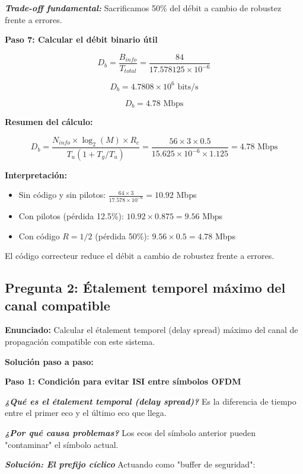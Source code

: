 \documentclass[11pt,a4paper]{article}
\begin{document}
\textit{\textbf{Trade-off fundamental:}} Sacrificamos 50\% del d\'ebit a cambio de robustez frente a errores.

\textbf{Paso 7: Calcular el d\'ebit binario \'util}

\[
D_b = \frac{B_{info}}{T_{total}} = \frac{84}{17.578125 \times 10^{-6}}
\]

\[
D_b = 4.7808 \times 10^6 \text{ bits/s}
\]

\[
\boxed{D_b = 4.78 \text{ Mbps}}
\]

\textbf{Resumen del c\'alculo:}

\[
D_b = \frac{N_{info} \times \log_2(M) \times R_c}{T_u(1 + T_g/T_u)} = \frac{56 \times 3 \times 0.5}{15.625 \times 10^{-6} \times 1.125} = 4.78 \text{ Mbps}
\]

\textbf{Interpretaci\'on:}

\begin{itemize}
    \item Sin c\'odigo y sin pilotos: $\frac{64 \times 3}{17.578 \times 10^{-6}} = 10.92$ Mbps
    \item Con pilotos (p\'erdida 12.5\%): $10.92 \times 0.875 = 9.56$ Mbps
    \item Con c\'odigo $R=1/2$ (p\'erdida 50\%): $9.56 \times 0.5 = 4.78$ Mbps
\end{itemize}

El c\'odigo correcteur reduce el d\'ebit a cambio de robustez frente a errores.

\subsection*{Pregunta 2: \'Etalement temporel m\'aximo del canal compatible}

\textbf{Enunciado:} Calcular el \'etalement temporel (delay spread) m\'aximo del canal de propagaci\'on compatible con este sistema.

\vspace{0.3cm}
\textbf{Soluci\'on paso a paso:}

\textbf{Paso 1: Condici\'on para evitar ISI entre s\'imbolos OFDM}

\textit{\textbf{¿Qu\'e es el \'etalement temporal (delay spread)?}} Es la diferencia de tiempo entre el primer eco y el \'ultimo eco que llega.

\textit{\textbf{¿Por qu\'e causa problemas?}} Los ecos del s\'imbolo anterior pueden "contaminar" el s\'imbolo actual.

\textit{\textbf{Soluci\'on: El prefijo c\'iclico}} Actuando como "buffer de seguridad":
\end{document}
